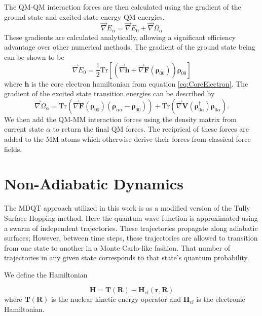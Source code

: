     The QM-QM interaction forces are then calculated using the gradient of the ground state and excited state energy QM energies. 
    \begin{equation} \label{eq:NEXMDForces}
      \vec{\nabla} E_\alpha = \vec{\nabla} E_0 + \vec{\nabla}\Omega_\alpha
    \end{equation}
    These gradients are calculated analytically, allowing a significant efficiency advantage over other numerical methods.
    The gradient of the ground state being can be shown to be
    \begin{equation}
      \vec{\nabla}E_0 = \frac{1}{2} \text{Tr} \left[ \left(\vec{\nabla} \mathbf{h} + \vec{\nabla} \mathbf{F}(\bm{\rho}_{00}) \right)\bm{\rho}_{00} \right]
    \end{equation}
    where \(\mathbf{h}\) is the core electron hamiltonian from equation \ref{eq:CoreElectron}.
    The gradient of the excited state transition energies can be described by
    \begin{equation}
      \vec{\nabla}\Omega_\alpha = \text{Tr} \left( \vec{\nabla}\mathbf{F}(\bm{\rho}_{00}) \left( \bm{\rho}_{\alpha\alpha} - \bm{\rho}_{00} \right) \right) + \text{Tr} \left( \vec{\nabla}\mathbf{V} (\bm{\rho}_{0\alpha}^\dagger) \bm{\rho}_{0\alpha} \right).
    \end{equation}
We then add the QM-MM interaction forces using the density matrix from current state \(\alpha\) to return the final QM forces. The reciprical of these forces are added to the MM atoms which otherwise derive their forces from classical force fields.

\section{Non-Adiabatic Dynamics}

The MDQT approach utilized in this work is as a modified version of the Tully Surface Hopping method.\cite{tully2012perspective, tully1990molecular,Tully1998}
Here the quantum wave function is approximated using a swarm of independent trajectories.
These trajectories propagate along adiabatic surfaces;
However, between time steps, these trajectories are allowed to transition from one state to another in a Monte Carlo-like fashion.
That number of trajectories in any given state corresponds to that state's quantum probability.

We define the Hamiltonian

          \begin{equation} \label{eq:tullyHamiltonian} \mathbf{H} = \mathbf{T}(\mathbf{R}) +
            \mathbf{H}_{el}(\mathbf{r},\mathbf{R})
          \end{equation}
          where \(\mathbf{T}(\mathbf{R}) \) is the nuclear kinetic energy operator and \(\textbf{H}_{el}\) is the electronic Hamiltonian.

